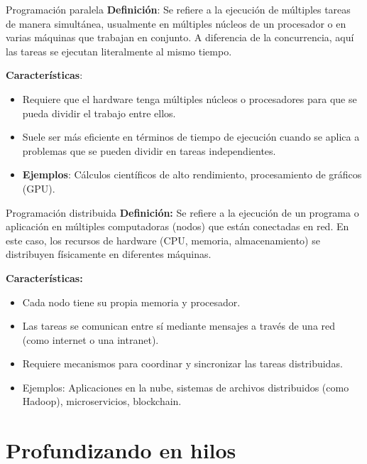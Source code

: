 \documentclass{beamer}
\begin{document}
\begin{frame}{Programación paralela}
\textbf{Definición}: Se refiere a la ejecución de múltiples tareas de manera simultánea, usualmente en múltiples núcleos de un procesador o en varias máquinas que trabajan en conjunto. A diferencia de la concurrencia, aquí las tareas se ejecutan literalmente al mismo tiempo.

\textbf{Características}:
\begin{itemize}
    \item Requiere que el hardware tenga múltiples núcleos o procesadores para que se pueda dividir el trabajo entre ellos.
    \item Suele ser más eficiente en términos de tiempo de ejecución cuando se aplica a problemas que se pueden dividir en tareas independientes.
    \item \textbf{Ejemplos}: Cálculos científicos de alto rendimiento, procesamiento de gráficos (GPU).
\end{itemize}
\end{frame}

\begin{frame}{Programación distribuida}
\textbf{Definición: }Se refiere a la ejecución de un programa o aplicación en múltiples computadoras (nodos) que están conectadas en red. En este caso, los recursos de hardware (CPU, memoria, almacenamiento) se distribuyen físicamente en diferentes máquinas.


\textbf{Características:}
    \begin{itemize}
        \item Cada nodo tiene su propia memoria y procesador.
        \item Las tareas se comunican entre sí mediante mensajes a través de una red (como internet o una intranet).
        \item Requiere mecanismos para coordinar y sincronizar las tareas distribuidas.
        \item Ejemplos: Aplicaciones en la nube, sistemas de archivos distribuidos (como Hadoop), microservicios, blockchain.
    \end{itemize}
\end{frame}

\section{Profundizando en hilos}
\end{document}
